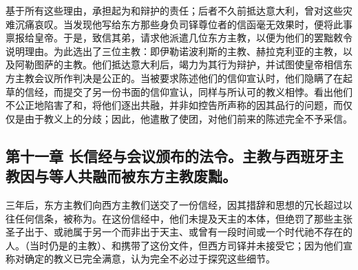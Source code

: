基于所有这些理由，承担起为和辩护的责任；后者不久前抵达意大利，曾对这些灾难沉痛哀叹。当发现他写给东方那些身负司铎尊位者的信函毫无效果时，便将此事禀报给皇帝。于是，致信其弟，请求他派遣几位东方主教，以便为他们的罢黜敕令说明理由。为此选出了三位主教：即伊勒诺波利斯的主教、赫拉克利亚的主教，以及阿勒图萨的主教。他们抵达意大利后，竭力为其行为辩护，并试图使皇帝相信东方主教会议所作判决是公正的。当被要求陈述他们的信仰宣认时，他们隐瞒了在起草的信经，而提交了另一份书面的信仰宣认，同样与所认可的教义相悖。看出他们不公正地陷害了和，将他们逐出共融，并非如控告所声称的因其品行的问题，而仅仅是由于教义上的分歧；因此，他遣散了使团，对他们前来的陈述完全不予采信。\par


\subsection{第十一章 长信经与会议颁布的法令。主教与西班牙主教因与等人共融而被东方主教废黜。}

三年后，东方主教们向西方主教们送交了一份信经，因其措辞和思想的冗长超过以往任何信条，被称为。在这份信经中，他们未提及天主的本体，但绝罚了那些主张圣子出于、或祂属于另一个而非出于天主、或曾有一段时间或一个时代祂不存在的人。（当时仍是的主教）、和携带了这份文件，但西方司铎并未接受它；因为他们宣称对确定的教义已完全满意，认为完全不必过于探究这些细节。\par

